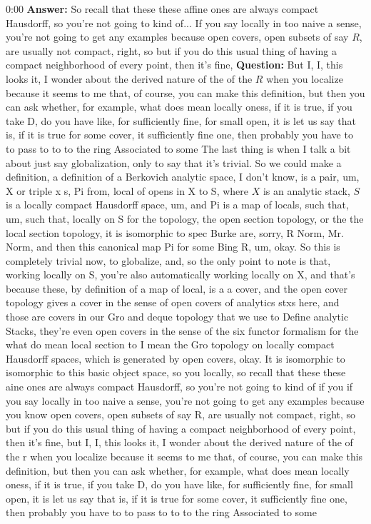 \begin{unfinished}{0:00}
{\textbf{Answer:} So recall that these these affine ones are always compact Hausdorff, so you're not going to kind of... If you say locally in too naive a sense, you're not going to get any examples because open covers, open subsets of say $R$, are usually not compact, right, so but if you do this usual thing of having a compact neighborhood of every point, then it's fine, 
\textbf{Question:} But I, I, this looks it, I wonder about the derived nature of the of the $R$ when you localize because it seems to me that, of course, you can make this definition, but then you can ask whether, for example, what does mean locally oness, if it is true, if you take D, do you have like, for sufficiently fine, for small open, it is let us say that is, if it is true for some cover, it sufficiently fine one, then probably you have to to pass to to to the ring Associated to some
The last thing is when I talk a bit about just say globalization, only to say that it's trivial. So we could make a definition, a definition of a Berkovich analytic space, I don't know, is a pair, um, X or triple x s, Pi from, local of opens in X to S, where $X$ is an analytic stack, $S$ is a locally compact Hausdorff space, um, and Pi is a map of locals, such that, um, such that, locally on S for the topology, the open section topology, or the the local section topology, it is isomorphic to spec Burke are, sorry, R Norm, Mr. Norm, and then this canonical map Pi for some Bing R, um, okay. So this is completely trivial now, to globalize, and, so the only point to note is that, working locally on S, you're also automatically working locally on X, and that's because these, by definition of a map of local, is a a cover, and the open cover topology gives a cover in the sense of open covers of analytics stxs here, and those are covers in our Gro and deque topology that we use to Define analytic Stacks, they're even open covers in the sense of the six functor formalism for the what do mean local section to I mean the Gro topology on locally compact Hausdorff spaces, which is generated by open covers, okay. It is isomorphic to isomorphic to this basic object space, so you locally, so recall that these these aine ones are always compact Hausdorff, so you're not going to kind of if you if you say locally in too naive a sense, you're not going to get any examples because you know open covers, open subsets of say R, are usually not compact, right, so but if you do this usual thing of having a compact neighborhood of every point, then it's fine, but I, I, this looks it, I wonder about the derived nature of the of the r when you localize because it seems to me that, of course, you can make this definition, but then you can ask whether, for example, what does mean locally oness, if it is true, if you take D, do you have like, for sufficiently fine, for small open, it is let us say that is, if it is true for some cover, it sufficiently fine one, then probably you have to to pass to to to the ring Associated to some
}
\end{unfinished}
